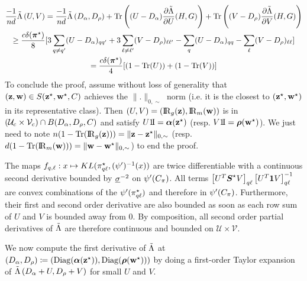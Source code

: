 \begin{multline*}
\frac{-1}{nd} \Lambtilde\left( U, V \right) =  \frac{-1}{nd} \Lambtilde\left( D_{\pii}, D_{\rhoo} \right) + \Trace\left((U - D_{\pii}) \frac{\partial \Lambtilde}{\partial U}(H, G) \right) + \Trace\left((V - D_{\rhoo}) \frac{\partial \Lambtilde}{\partial V}(H, G) \right) \\
\geq \frac{c\delta(\bals)}{8} [ 3 \sum_{\kk \neq \kp} (U - D_{\pii})_{\kk\kp} + 3 \sum_{\el \neq \lp} (V-D_{\rhoo})_{\el\lp} - \sum_{\kk} (U - D_{\pii})_{\kk\kk} - \sum_{\el} (V-D_{\rhoo})_{\el\el} ] \\
= \frac{c\delta(\bals)}{4} [ (1 - \Trace(U)) + (1 - \Trace(V))]
\end{multline*}
To conclude the proof, assume without loss of generality that $(\mathbf{z}, \mathbf{w}) \in S(\mathbf{z}^\star, \mathbf{w}^\star, C)$ achieves the $\|.\|_{0,\sim}$ norm (i.e. it is the closest to $(\mathbf{z}^\star, \mathbf{w}^\star)$ in its representative class). Then $(U, V) = (\Rgbz, \Rmbw)$ is in $(\mathcal{U}_c \times \mathcal{V}_c) \cap B(D_{\alpha}, D_{\rho}, C)$ and satisfy $U\un = \bpi(\bzs)$ (resp. $V\un = \brho(\bws)$). We just need to note $\n(1 - \Trace(\Rgbz)) = \| \bz - \bzs\|_{0,\sim}$ (resp. $\dd(1 - \Trace(\Rmbw)) = \| \bw - \bws\|_{0,\sim}$) to end the proof. \proofend

The maps $f_{q,\ell}: x \mapsto KL(\pi^\star_{q\ell}, (\psi')^{-1}(x))$ are twice differentiable with a continuous second derivative bounded by $\underline{\sigma}^{-2}$ on $\psi'(C_\pi)$. All terms $\left[U{^{T}} \boldsymbol{S}^{\star} V \right]_{q\ell}\left[U{^{T}} \mathbf{1} V \right]_{q\ell}^{-1}$ are convex combinations of the $\psi'(\pi^\star_{q\ell})$ and therefore in $\psi'(C_\pi)$. Furthermore, their first and second order derivative are also bounded as soon as each row sum of $U$ and $V$ is bounded away from $0$. By composition, all second order partial derivatives of $\tilde{\Lambda}$ are therefore continuous and bounded on $\mathcal{U} \times \mathcal{V}$. 

We now compute the first derivative of $\tilde{\Lambda}$ at $(D_{\alpha}, D_{\rho}) \coloneqq (\operatorname{Diag}(\boldsymbol{\alpha}(\mathbf{z}^\star)), \operatorname{Diag}(\boldsymbol{\rho}(\mathbf{w}^\star)))$ by doing a first-order Taylor expansion of $\tilde{\Lambda}\left( D_{\alpha} + U, D_{\rho} + V \right)$ for small $U$ and $V$. 

